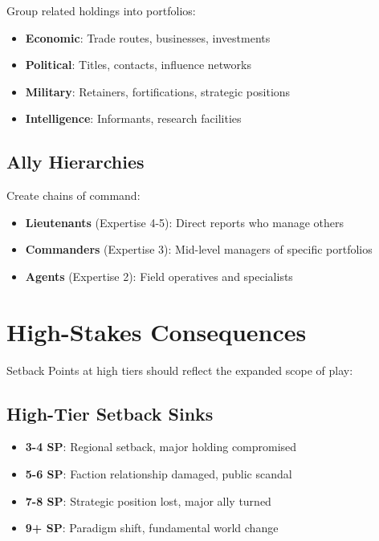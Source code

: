 Group related holdings into portfolios:
\begin{itemize}
    \item \textbf{Economic}: Trade routes, businesses, investments
    \item \textbf{Political}: Titles, contacts, influence networks
    \item \textbf{Military}: Retainers, fortifications, strategic positions
    \item \textbf{Intelligence}: Informants, research facilities
\end{itemize}

\subsection*{Ally Hierarchies}

Create chains of command:
\begin{itemize}
    \item \textbf{Lieutenants} (Expertise 4-5): Direct reports who manage others
    \item \textbf{Commanders} (Expertise 3): Mid-level managers of specific portfolios
    \item \textbf{Agents} (Expertise 2): Field operatives and specialists
\end{itemize}

\section{High-Stakes Consequences}

Setback Points at high tiers should reflect the expanded scope of play:

\subsection*{High-Tier Setback Sinks}

\begin{itemize}
    \item \textbf{3-4 SP}: Regional setback, major holding compromised
    \item \textbf{5-6 SP}: Faction relationship damaged, public scandal
    \item \textbf{7-8 SP}: Strategic position lost, major ally turned
    \item \textbf{9+ SP}: Paradigm shift, fundamental world change
\end{itemize}

